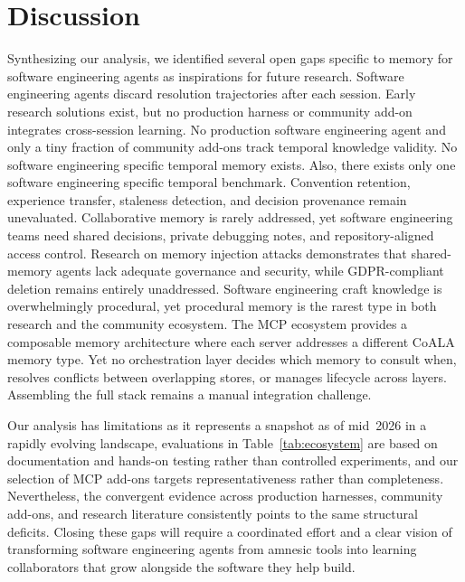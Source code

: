 \documentclass[runningheads]{llncs}
\begin{document}
\section{Discussion}\label{sec:gaps}

Synthesizing our analysis, we identified several open gaps specific to memory
for software engineering agents as inspirations for future research. Software engineering agents discard resolution trajectories after each session. Early
research solutions exist, but no production
harness or community add-on integrates cross-session learning. No production software engineering agent and only a tiny fraction of community add-ons track temporal knowledge validity.
No software engineering specific
temporal memory exists. Also, there exists only one software engineering specific temporal
benchmark. Convention retention, experience transfer,
staleness detection, and decision provenance remain unevaluated. Collaborative memory is rarely addressed, yet software engineering teams
need shared decisions, private debugging notes, and repository-aligned
access control. Research on memory injection attacks demonstrates that shared-memory agents lack adequate governance and security, while GDPR-compliant deletion remains entirely unaddressed. Software engineering craft knowledge is overwhelmingly procedural, yet procedural memory
is the rarest type in both research and the community
ecosystem. The MCP ecosystem provides a composable memory architecture where
each server addresses a different CoALA memory type. Yet no orchestration layer decides which
memory to consult when, resolves conflicts between overlapping stores,
or manages lifecycle across layers. Assembling the full stack remains
a manual integration challenge.

Our analysis has limitations as it represents a snapshot as of mid~2026 in a rapidly evolving landscape, evaluations in Table~\ref{tab:ecosystem} are based on documentation and hands-on testing rather than controlled experiments, and our selection of MCP add-ons targets representativeness rather than completeness. Nevertheless, the convergent evidence across production harnesses, community add-ons, and research literature consistently points to the same structural deficits. Closing these gaps will require a
coordinated effort and a clear vision of transforming software engineering agents from amnesic
tools into learning collaborators that grow alongside the
software they help build.
\end{document}
